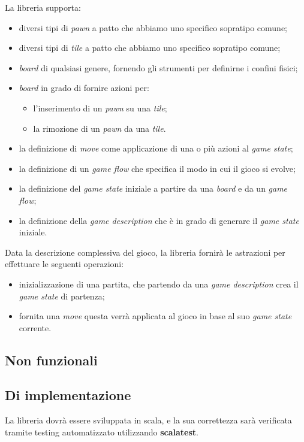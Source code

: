 La libreria supporta:
%
\begin{itemize}
    \item diversi tipi di \textit{pawn} a patto che abbiamo uno specifico sopratipo comune;
    \item diversi tipi di \textit{tile} a patto che abbiamo uno specifico sopratipo comune;
    \item \textit{board} di qualsiasi genere, fornendo gli strumenti per definirne i confini fisici;
    \item \textit{board} in grado di fornire azioni per:
          \begin{itemize}
              \item l'inserimento di un \textit{pawn} su una \textit{tile};
              \item la rimozione di un \textit{pawn} da una \textit{tile}.
          \end{itemize}
    \item la definizione di \textit{move} come applicazione di una o più azioni al \textit{game state};
    \item la definizione di un \textit{game flow} che specifica il modo in cui il gioco si evolve;
    \item la definizione del \textit{game state} iniziale a partire da una \textit{board} e da un \textit{game flow};
    \item la definizione della \textit{game description} che è in grado di generare il \textit{game state} iniziale.
\end{itemize}
%
Data la descrizione complessiva del gioco, la libreria fornirà le astrazioni per effettuare le seguenti operazioni:
%
\begin{itemize}
    \item inizializzazione di una partita, che partendo da una \textit{game description} crea il \textit{game state} di partenza;
    \item fornita una \textit{move} questa verrà applicata al gioco in base al suo \textit{game state} corrente.
\end{itemize}

\subsection{Non funzionali}



\subsection{Di implementazione}

La libreria dovrà essere sviluppata in scala, e la sua correttezza sarà verificata tramite testing automatizzato utilizzando \textbf{scalatest}.